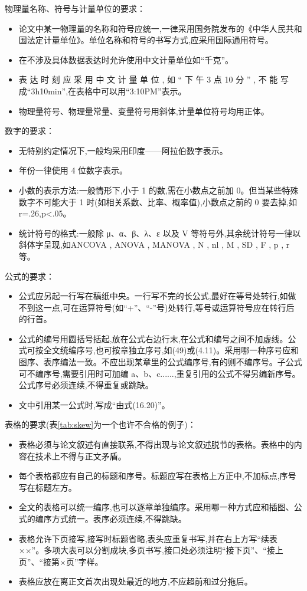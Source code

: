 \documentclass{sysuthesis}
\begin{document}
物理量名称、符号与计量单位的要求：

\begin{itemize}
\item 论文中某一物理量的名称和符号应统一,一律采用国务院发布的《中华人民共和国法定计量单位》。单位名称和符号的书写方式,应采用国际通用符号。
\item 在不涉及具体数据表达时允许使用中文计量单位如“千克”。
\item 表 达 时 刻 应 采 用 中 文 计 量 单 位 , 如 “ 下 午 3 点 10 分 ” , 不 能 写 成“3h10min”,在表格中可以用“3:10PM”表示。
\item 物理量符号、物理量常量、变量符号用斜体,计量单位符号均用正体。
\end{itemize}

数字的要求：

\begin{itemize}
\item 无特别约定情况下,一般均采用印度——阿拉伯数字表示。
\item 年份一律使用 4 位数字表示。
\item 小数的表示方法:一般情形下,小于 1 的数,需在小数点之前加 0。但当某些特殊数字不可能大于 1 时(如相关系数、比率、概率值),小数点之前的 0 要去掉,如 r=.26,p<.05。
\item 统计符号的格式:一般除 μ、α、β、λ、ε 以及 V 等符号外,其余统计符号一律以斜体字呈现,如ANCOVA , ANOVA , MANOVA , N , nl , M , SD , F , p , r 等。
\end{itemize}

公式的要求：

\begin{itemize}
\item 公式应另起一行写在稿纸中央。一行写不完的长公式,最好在等号处转行,如做不到这一点,可在运算符号(如“+”、“-”号)处转行,等号或运算符号应在转行后的行首。
\item 公式的编号用圆括号括起,放在公式右边行末,在公式和编号之间不加虚线。公式可按全文统编序号,也可按章独立序号,如(49)或(4.11)。采用哪一种序号应和图序、表序编法一致。不应出现某章里的公式编序号,有的则不编序号。子公式可不编序号,需要引用时可加编 a、b、c......,重复引用的公式不得另编新序号。公式序号必须连续,不得重复或跳缺。
\item 文中引用某一公式时,写成“由式(16.20)”。
\end{itemize}

表格的要求(表\ref{tab:skew}为一个也许不合格的例子)：

\begin{itemize}
\item 表格必须与论文叙述有直接联系,不得出现与论文叙述脱节的表格。表格中的内容在技术上不得与正文矛盾。
\item 每个表格都应有自己的标题和序号。标题应写在表格上方正中,不加标点,序号写在标题左方。
\item 全文的表格可以统一编序,也可以逐章单独编序。采用哪一种方式应和插图、公式的编序方式统一。表序必须连续,不得跳缺。
\item 表格允许下页接写,接写时标题省略,表头应重复书写,并在右上方写“续表××”。多项大表可以分割成块,多页书写,接口处必须注明“接下页”、“接上页”、“接第×页”字样。
\item 表格应放在离正文首次出现处最近的地方,不应超前和过分拖后。
\end{itemize}
\end{document}
